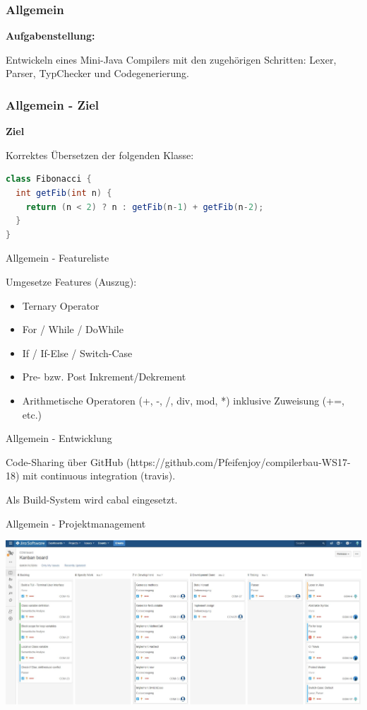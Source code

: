 \begin{frame}
	\frametitle{Allgemein}
	
\textbf{Aufgabenstellung:}

Entwickeln eines Mini-Java Compilers mit den zugehörigen Schritten: Lexer, Parser, TypChecker und Codegenerierung.
\end{frame}

\begin{frame}[fragile]
\frametitle{Allgemein - Ziel}

\textbf{Ziel} 

Korrektes Übersetzen der folgenden Klasse:

\begin{lstlisting}[language=Java]
class Fibonacci {
  int getFib(int n) {
    return (n < 2) ? n : getFib(n-1) + getFib(n-2);
  }
}
\end{lstlisting}	
\end{frame}



\begin{frame}{Allgemein - Featureliste}

Umgesetze Features (Auszug):

\pause

\begin{itemize}
	\item Ternary Operator \pause
	\item For / While / DoWhile \pause
	\item If / If-Else / Switch-Case \pause 
	\item Pre- bzw. Post Inkrement/Dekrement \pause 
	\item Arithmetische Operatoren (+, -, /, div, mod, *) inklusive Zuweisung (+=, etc.)
\end{itemize}	
\end{frame}

\begin{frame}{Allgemein - Entwicklung}

Code-Sharing über GitHub (https://github.com/Pfeifenjoy/compilerbau-WS17-18) mit continuous integration (travis).

\par \medskip

\pause

Als Build-System wird cabal eingesetzt.	
\end{frame}

\begin{frame}{Allgemein - Projektmanagement}

\includegraphics[scale=0.25]{images/allgemein/jira.jpg}

\end{frame}

